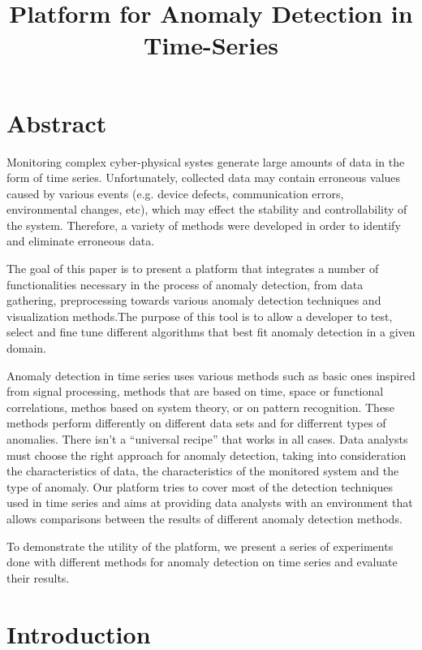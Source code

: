 \documentclass{article}
\title{Platform for Anomaly Detection in Time-Series}
\begin{document}
\maketitle

\section*{Abstract}

Monitoring complex cyber-physical systes generate large amounts of data in the form of time series. Unfortunately, collected data may contain erroneous values caused by various events (e.g. device defects, communication errors, environmental changes, etc), which may effect the stability and controllability of the system. Therefore, a variety of methods were developed in order to identify and eliminate erroneous data.

The goal of this paper is to present a platform that integrates a number of functionalities necessary in the process of anomaly detection, from data gathering, preprocessing towards various anomaly detection techniques and visualization methods.The purpose of this tool is to allow a developer to test, select and fine tune different algorithms that best fit anomaly detection in a given domain.

Anomaly detection in time series uses various methods such as basic ones inspired from signal processing, methods that are based on time, space or functional correlations, methos based on system theory, or on pattern recognition. These methods perform differently on different data sets and for differrent types of anomalies. There isn't a ``universal recipe'' that works in all cases. Data analysts must choose the right approach for anomaly detection, taking into consideration the characteristics of data, the characteristics of the monitored system and the type of anomaly. Our platform tries to cover most of the detection techniques used in time series and aims at providing data analysts with an environment that allows comparisons between the results of different anomaly detection methods.

To demonstrate the utility of the platform, we present a series of experiments done with different methods for anomaly detection on time series and evaluate their results.

\section{Introduction}
\end{document}
